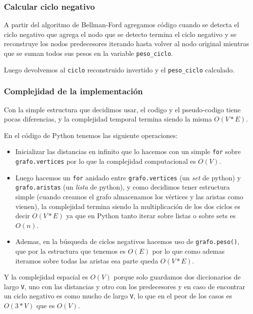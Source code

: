 \documentclass[titlepage,a4paper]{article}
\begin{document}
\subsubsection{Calcular ciclo negativo}
\label{sec:orgc848696}

A partir del algoritmo de Bellman-Ford agregamos código cuando se detecta el
ciclo negativo que agrega el nodo que se detecto termina el ciclo negativo y se
reconstruye los nodos predecesores iterando hasta volver al nodo original
mientras que se suman todos sus pesos en la variable \texttt{peso\_ciclo}.

Luego devolvemos al \texttt{ciclo} reconstruido invertido y el \texttt{peso\_ciclo} calculado.

\subsubsection{Complejidad de la implementación}
\label{sec:orgec75b1a}

Con la simple estructura que decidimos usar, el codigo y el pseudo-codigo tiene
pocas diferencias, y la complejidad temporal termina siendo la misma \(O(V * E)\).

En el código de Python tenemos las siguiente operaciones:
\begin{itemize}
\item Inicializar las distancias en infinito que lo hacemos con un simple \texttt{for}
sobre \texttt{grafo.vertices} por lo que la complejidad computacional es \(O(V)\).
\item Luego hacemos un \texttt{for} anidado entre \texttt{grafo.vertices} (un \emph{set} de python) y
\texttt{grafo.aristas} (un \emph{lista} de python), y como decidimos tener estructura
simple (cuando creamos el grafo almacenamos los vértices y las aristas como
vienen), la complejidad termina siendo la multiplicación de los dos ciclos es
decir \(O(V * E)\) ya que en Python tanto iterar sobre listas o sobre sets es
\(O(n)\).
\item Ademas, en la búsqueda de ciclos negativos hacemos uso de \texttt{grafo.peso()}, que
por la estructura que tenemos es \(O(E)\) por lo que como ademas iteramos sobre
todas las aristas esa parte queda \(O(V * E)\).
\end{itemize}

Y la complejidad espacial es \(O(V)\) porque solo guardamos dos diccionarios de
largo \texttt{V}, uno con las distancias y otro con los predecesores y en caso de
encontrar un ciclo negativo es como mucho de largo \texttt{V}, lo que en el peor de los
casos es \(O(3*V)\) que es \(O(V)\).
\end{document}
